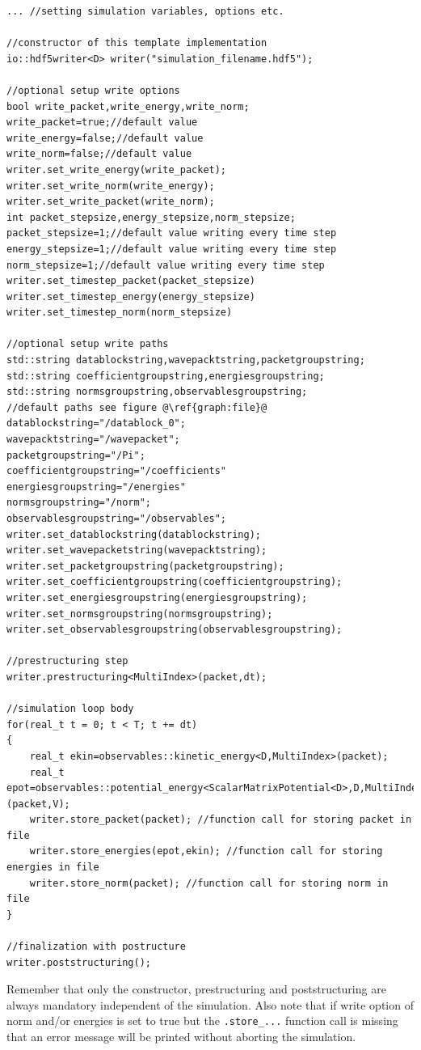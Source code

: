 \begin{lstlisting}
... //setting simulation variables, options etc.

//constructor of this template implementation
io::hdf5writer<D> writer("simulation_filename.hdf5");

//optional setup write options
bool write_packet,write_energy,write_norm;
write_packet=true;//default value
write_energy=false;//default value
write_norm=false;//default value
writer.set_write_energy(write_packet);
writer.set_write_norm(write_energy);
writer.set_write_packet(write_norm);
int packet_stepsize,energy_stepsize,norm_stepsize;
packet_stepsize=1;//default value writing every time step
energy_stepsize=1;//default value writing every time step
norm_stepsize=1;//default value writing every time step
writer.set_timestep_packet(packet_stepsize)
writer.set_timestep_energy(energy_stepsize)
writer.set_timestep_norm(norm_stepsize)

//optional setup write paths
std::string datablockstring,wavepacktstring,packetgroupstring;
std::string coefficientgroupstring,energiesgroupstring;
std::string normsgroupstring,observablesgroupstring;
//default paths see figure @\ref{graph:file}@
datablockstring="/datablock_0";
wavepacktstring="/wavepacket";
packetgroupstring="/Pi";
coefficientgroupstring="/coefficients"
energiesgroupstring="/energies"
normsgroupstring="/norm";
observablesgroupstring="/observables";
writer.set_datablockstring(datablockstring);
writer.set_wavepacketstring(wavepacktstring);
writer.set_packetgroupstring(packetgroupstring);
writer.set_coefficientgroupstring(coefficientgroupstring);
writer.set_energiesgroupstring(energiesgroupstring);
writer.set_normsgroupstring(normsgroupstring);
writer.set_observablesgroupstring(observablesgroupstring);

//prestructuring step
writer.prestructuring<MultiIndex>(packet,dt);

//simulation loop body
for(real_t t = 0; t < T; t += dt)
{
	real_t ekin=observables::kinetic_energy<D,MultiIndex>(packet);
	real_t epot=observables::potential_energy<ScalarMatrixPotential<D>,D,MultiIndex,TQR>(packet,V);
	writer.store_packet(packet); //function call for storing packet in file
	writer.store_energies(epot,ekin); //function call for storing energies in file
	writer.store_norm(packet); //function call for storing norm in file	
}

//finalization with postructure
writer.poststructuring();
\end{lstlisting}
Remember that only the constructor, prestructuring and poststructuring are always mandatory independent of the simulation. Also note that if write option of norm and/or energies is set to true but the \texttt{.store\_...} function call is missing that an error message will be printed without aborting the simulation. 

